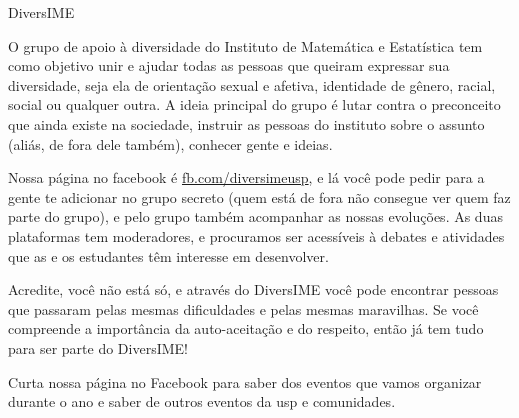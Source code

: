 \begin{subsecao}{DiversIME}


O grupo de apoio à diversidade do Instituto de Matemática e Estatística tem como
objetivo unir e ajudar todas as pessoas que queiram expressar sua diversidade,
seja ela de orientação sexual e afetiva, identidade de gênero, racial, social ou
qualquer outra. A ideia principal do grupo é lutar contra o preconceito que
ainda existe na sociedade, instruir as pessoas do instituto sobre o assunto
(aliás, de fora dele também), conhecer gente e ideias.

Nossa página no facebook é \url{fb.com/diversimeusp}, e lá você pode pedir para
a gente te adicionar no grupo secreto (quem está de fora não consegue ver quem
faz parte do grupo), e pelo grupo também acompanhar as nossas evoluções. As duas 
plataformas tem moderadores, e procuramos ser acessíveis à debates e atividades 
que as e os estudantes têm interesse em desenvolver. 

Acredite, você não está só, e através do DiversIME você pode encontrar pessoas
que passaram pelas mesmas dificuldades e pelas mesmas maravilhas. Se você
compreende a importância da auto-aceitação e do respeito, então já tem tudo para
ser parte do DiversIME!

Curta nossa página no Facebook para saber dos eventos que vamos organizar 
durante o ano e saber de outros eventos da usp e comunidades. 

\end{subsecao}
